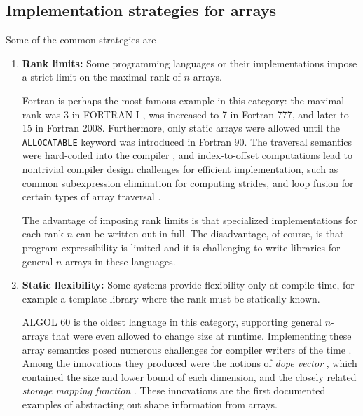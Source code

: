 \documentclass[preprint]{sigplanconf}
\newcommand{\ALGOL}{A\textsc{LGOL}}
\newcommand{\code}[1]{\texttt{#1}}
\begin{document}
\subsection{Implementation strategies for arrays}

Some of the common strategies are

\begin{enumerate}

\item {\bf Rank limits:} Some programming languages or their implementations
impose a strict limit on the maximal rank of $n$-arrays.

Fortran is perhaps the most famous example in this category: the maximal rank
was 3 in FORTRAN I \cite{Backus:1957fa}, was increased to 7 in Fortran 777,
and later to 15 in Fortran 2008. Furthermore, only static arrays were allowed
until the \code{ALLOCATABLE} keyword was introduced in Fortran 90. The
traversal semantics were hard-coded into the compiler \cite[pp.~10--
11]{Backus:1956pr}, and index-to-offset computations lead to nontrivial
compiler design challenges for efficient implementation, such as common
subexpression elimination for computing strides, and loop fusion for certain
types of array traversal \cite{Busam:1969oe}.



The advantage of imposing rank limits is that specialized implementations for
each rank $n$ can be written out in full. The disadvantage, of course, is that
program expressibility is limited and it is challenging to write libraries for
general $n$-arrays in these languages.

\item {\bf Static flexibility:} Some systems provide flexibility only at
compile time, for example a template library where the rank must be statically
known.

\ALGOL{} 60 is the oldest language in this category, supporting general
$n$-arrays that were even allowed to change size at runtime. Implementing
these array semantics posed numerous challenges for compiler writers of the
time \cite{Randell:1964a6}. Among the innovations they produced were the
notions of \textit{dope vector} \cite{Sattley:1960as, Sattley:1961as}, which
contained the size and lower bound of each dimension, and the closely related
\textit{storage mapping function} \cite[pp.~80--87]{Randell:1964a6}. These
innovations are the first documented examples of abstracting out shape
information from arrays.


\end{enumerate}
\end{document}
